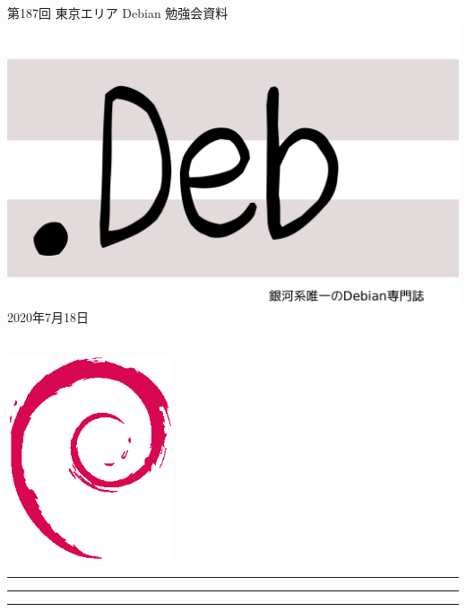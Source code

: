 \documentclass[mingoth,a4paper]{jsarticle}
\newcommand{\debmtgyear}{2020}
\newcommand{\debmtgmonth}{7}
\newcommand{\debmtgdate}{18}
\newcommand{\debmtgnumber}{187}
\begin{document}
\begin{titlepage}
\thispagestyle{empty}

\vspace*{-2cm}
第\debmtgnumber{}回 東京エリア Debian 勉強会資料\\
\hspace*{-2cm}
\includegraphics{image2012-natsu/dotdeb.pdf}\\
\hfill{}\debmtgyear{}年\debmtgmonth{}月\debmtgdate{}日

\\

\vspace*{-2cm}
\hfill{}\includegraphics[height=6cm]{image200502/openlogo-nd.eps}
\end{titlepage}

\newpage

\begin{minipage}[b]{0.2\hsize}
 \colorbox{titleback}{}
\end{minipage}
\begin{minipage}[b]{0.8\hsize}
\hrule
\vspace{2mm}
\hrule
\begin{multicols}{2}
\tableofcontents
\end{multicols}
\vspace{2mm}
\hrule
\end{minipage}
\end{document}
